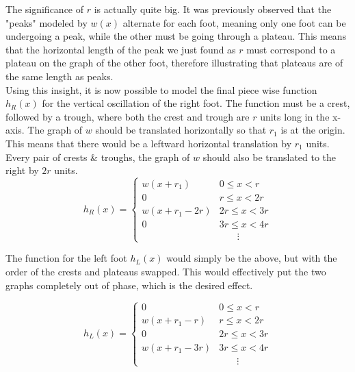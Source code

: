 \documentclass[12pt, a4paper]{article}
\begin{document}
The significance of $r$ is actually quite big. It was previously observed that
the "peaks" modeled by $w(x)$ alternate for each foot, meaning only one foot can
be undergoing a peak, while the other must be going through a plateau. This
means that the horizontal length of the peak we just found as $r$ must
correspond to a plateau on the graph of the other foot, therefore illustrating
that plateaus are of the same length as peaks. \\

Using this insight, it is now possible to model the final piece wise function
$h_{R}(x)$ for the vertical oscillation of the right foot. The function must be a
crest, followed by a trough, where both the crest and trough are $r$ units long
in the x-axis. The graph of $w$ should be translated horizontally so that $r_1$
is at the origin. This means that there would be a leftward horizontal
translation by $r_1$ units. Every pair of crests \& troughs, the graph of $w$
should also be translated to the right by $2r$ units.\\

\[ h_{R}(x)= \begin{cases} 
    w(x+r_1) & 0 \leq x < r \\
    0 & r \leq x < 2r \\[2mm]
    w(x + r_1 - 2r) & 2r \leq x < 3r \\
    0 & 3r \leq x < 4r \\[2mm]
    & \phantom{t=\,} \vdots
\end{cases}
\]

The function for the left foot $h_{L}(x)$ would simply be the above, but with
the order of the crests and plateaus swapped. This would effectively put the two
graphs completely out of phase, which is the desired effect.

\[ h_{L}(x)= \begin{cases} 
    0 & 0 \leq x < r \\
    w(x+r_1-r) & r \leq x < 2r \\[2mm]
    0 & 2r \leq x < 3r \\
    w(x+r_1-3r) & 3r \leq x < 4r \\[2mm]
    & \phantom{t=\,} \vdots
\end{cases}
\]
\end{document}

